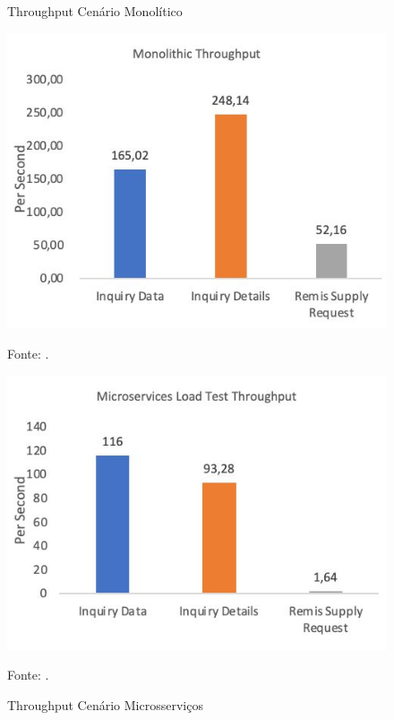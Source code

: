 \begin{figure}[htb]
  \centering
  \begin{minipage}[t]{0.48\linewidth}
    \caption{Throughput Cenário Monolítico}
    \label{fig:maulana_thp_mono}
    \centering
    \includegraphics[width=\linewidth]{imagens/maulana_thp_mono.jpg}    
    {\par \raggedright \footnotesize Fonte: \textcite{maulana_design_2022}.\par}
  \end{minipage}%
  \hfill
  \begin{minipage}[t]{0.48\linewidth}
    \caption{Throughput Cenário Microsserviços}
    \label{fig:maulana_thp_ms}
    \centering
    \includegraphics[width=\linewidth]{imagens/maulana_thp_ms.jpg}
    
    {\par \raggedright \footnotesize Fonte: \textcite{maulana_design_2022}.\par}
  \end{minipage}
\end{figure}

